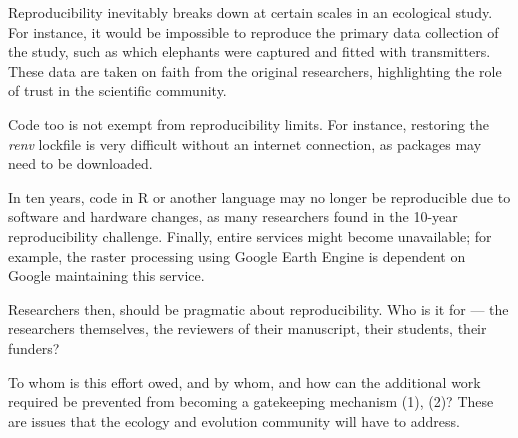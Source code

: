 	Reproducibility inevitably breaks down at certain scales in an ecological study. For instance, it would be impossible to reproduce the primary data collection of the study, such as which elephants were captured and fitted with transmitters. These data are taken on faith from the original researchers, highlighting the role of trust in the scientific community.

	Code too is not exempt from reproducibility limits. For instance, restoring the \textit{renv} lockfile is very difficult without an internet connection, as packages may need to be downloaded.

	In ten years, code in R or another language may no longer be reproducible due to software and hardware changes, as many researchers found in the 10-year reproducibility challenge. Finally, entire services might become unavailable; for example, the raster processing using Google Earth Engine is dependent on Google maintaining this service.

	Researchers then, should be pragmatic about reproducibility. Who is it for — the researchers themselves, the reviewers of their manuscript, their students, their funders?

	To whom is this effort owed, and by whom, and how can the additional work required be prevented from becoming a gatekeeping mechanism {\color{red}(1), (2)}? These are issues that the ecology and evolution community will have to address.
\afterpage{\nopagecolor}
\pagestyle{scrheadings}
